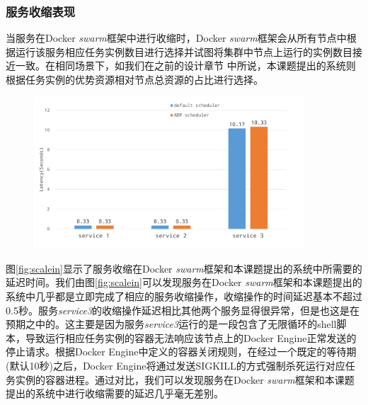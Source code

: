 \subsubsection{服务收缩表现}\label{sec:scalein}

当服务在Docker \emph{swarm}框架中进行收缩时，Docker \emph{swarm}框架会从所有节点中根据运行该服务相应任务实例数目进行选择并试图将集群中节点上运行的实例数目接近一致。在相同场景下，如我们在之前的设计章节%
中所说，本课题提出的系统则根据任务实例的优势资源相对节点总资源的占比进行选择。

\begin{figure}[htbp]
\centering
\includegraphics[width=0.9\textwidth]{./figure/scalein}
\end{figure}

图\ref{fig:scalein}显示了服务收缩在Docker \emph{swarm}框架和本课题提出的系统中所需要的延迟时间。我们由图\ref{fig:scalein}可以发现服务在Docker \emph{swarm}框架和本课题提出的系统中几乎都是立即完成了相应的服务收缩操作，收缩操作的时间延迟基本不超过0.5秒。服务\emph{service3}的收缩操作延迟相比其他两个服务显得很异常，但是也这是在预期之中的。这主要是因为服务\emph{service3}运行的是一段包含了无限循环的shell脚本，导致运行相应任务实例的容器无法响应该节点上的Docker Engine正常发送的停止请求。根据Docker Engine中定义的容器关闭规则，在经过一个既定的等待期(默认10秒)之后，Docker Engine将通过发送SIGKILL的方式强制杀死运行对应任务实例的容器进程。通过对比，我们可以发现服务在Docker \emph{swarm}框架和本课题提出的系统中进行收缩需要的延迟几乎毫无差别。

